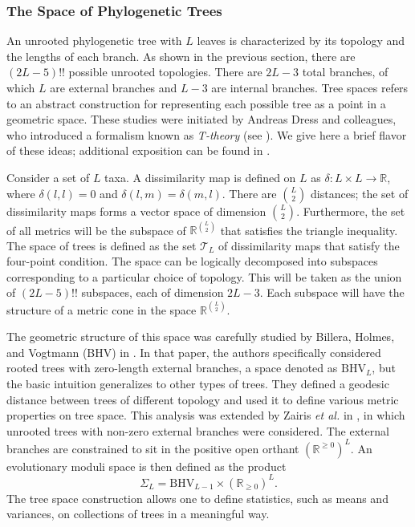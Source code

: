\subsubsection{The Space of Phylogenetic Trees}
\label{bg:bio:phylo:space}

An unrooted phylogenetic tree with $L$ leaves is characterized by its topology and the lengths of each branch.
As shown in the previous section, there are $(2L-5)!!$ possible unrooted topologies.
There are $2L-3$ total branches, of which $L$ are external branches and $L-3$ are internal branches.
Tree spaces refers to an abstract construction for representing each possible tree as a point in a geometric space.
These studies were initiated by Andreas Dress and colleagues, who introduced a formalism known as \emph{T-theory} (see \cite{Dress:1998vq,Dress:1996di,Dress:1614018}).
We give here a brief flavor of these ideas; additional exposition can be found in \cite[\S 7]{Pachter:2005vo}.

Consider a set of $L$ taxa.
A dissimilarity map is defined on $L$ as $\delta : L \times L \rightarrow \mathbb{R}$, where $\delta(l,l)=0$ and $\delta(l,m)=\delta(m,l)$.
There are $\binom{L}{2}$ distances; the set of dissimilarity maps forms a vector space of dimension $\binom{L}{2}$.
Furthermore, the set of all metrics will be the subspace of $\mathbb{R}^{\binom{L}{2}}$ that satisfies the triangle inequality.
The space of trees is defined as the set $\mathcal{T}_{L}$ of dissimilarity maps that satisfy the four-point condition.
The space can be logically decomposed into subspaces corresponding to a particular choice of topology.
This will be taken as the union of $(2L-5)!!$ subspaces, each of dimension $2L-3$.
Each subspace will have the structure of a metric cone in the space $\mathbb{R}^{\binom{L}{2}}$.

The geometric structure of this space was carefully studied by Billera, Holmes, and Vogtmann (BHV) in \cite{Billera:2001tv}.
In that paper, the authors specifically considered rooted trees with zero-length external branches, a space denoted as $\mathrm{BHV}_{L}$, but the basic intuition generalizes to other types of trees.
They defined a geodesic distance between trees of different topology and used it to define various metric properties on tree space.
This analysis was extended by Zairis \emph{et al.} in \cite{Zairis:2014wa}, in which unrooted trees with non-zero external branches were considered.
The external branches are constrained to sit in the positive open orthant $(\mathbb{R}^{\geq 0})^{L}$.
An evolutionary moduli space is then defined as the product
\begin{equation}
\Sigma_{L} = \mathrm{BHV}_{L-1} \times (\mathbb{R}_{\geq 0})^{L}.
\end{equation}
The tree space construction allows one to define statistics, such as means and variances, on collections of trees in a meaningful way.

